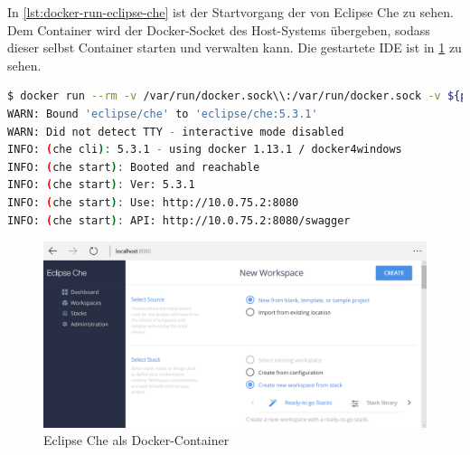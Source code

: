 In \cref{lst:docker-run-eclipse-che} ist der Startvorgang der von Eclipse Che zu sehen.
Dem Container wird der Docker-Socket des Host-Systems übergeben, sodass dieser selbst Container starten und verwalten kann.
Die gestartete IDE ist in \cref{fig:eclipse-che-demo} zu sehen.

\begin{lstlisting}[caption=Docker-Kommando zum Starten von Eclipse Che, language=bash, label=lst:docker-run-eclipse-che]
$ docker run --rm -v /var/run/docker.sock\\:/var/run/docker.sock -v ${pwd}:/data eclipse/che start
WARN: Bound 'eclipse/che' to 'eclipse/che:5.3.1'
WARN: Did not detect TTY - interactive mode disabled
INFO: (che cli): 5.3.1 - using docker 1.13.1 / docker4windows
INFO: (che start): Booted and reachable
INFO: (che start): Ver: 5.3.1
INFO: (che start): Use: http://10.0.75.2:8080
INFO: (che start): API: http://10.0.75.2:8080/swagger
\end{lstlisting}

\begin{figure}[htbp]
    \centering
    \includegraphics[width=0.9\linewidth,clip]{images/eclipse-che-demo}
    \caption{Eclipse Che als Docker-Container}
\label{fig:eclipse-che-demo}
\end{figure}



